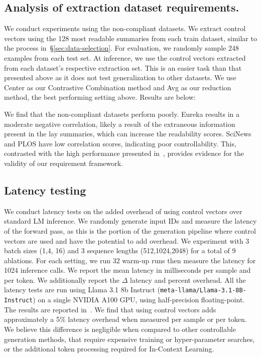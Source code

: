 \subsection{Analysis of extraction dataset requirements.}\label{sec:other-datasets-exp}
We conduct experiments using the non-compliant datasets. We extract control vectors using the 128 most readable summaries from each train dataset, similar to the process in~\S\ref{sec:data-selection}. For evaluation, we randomly sample 248 examples from each test set. At inference, we use the control vectors extracted from each dataset's respective extraction set. This is an easier task than that presented above as it does not test generalization to other datasets. We use Center as our Contrastive Combination method and Avg as our reduction method, the best performing setting above. Results are below:


We find that the non-compliant datasets perform poorly. Eureka results in a moderate negative correlation, likely a result of the extraneous information present in the lay summaries, which can increase the readability scores. SciNews and PLOS have low correlation scores, indicating poor controllability. This, contrasted with the high performance presented in~, provides evidence for the validity of our requirement framework.


\subsection{Latency testing}\label{appendix:latency-testing}

We conduct latency tests on the added overhead of using control vectors over standard LM inference. We randomly generate input IDs and measure the latency of the forward pass, as this is the portion of the generation pipeline where control vectors are used and have the potential to add overhead. We experiment with 3 batch sizes (1,4, 16) and 3 sequence lengths (512,1024,2048) for a total of 9 ablations. For each setting, we run 32 warm-up runs then measure the latency for 1024 inference calls. We report the mean latency in milliseconds per sample and per token. We additionally report the $\Delta$ latency and percent overhead. All the latency tests are run using Llama 3.1 8b Instruct (\texttt{meta-llama/Llama-3.1-8B-Instruct}) on a single NVIDIA A100 GPU, using half-precision floating-point. The results are reported in~. We find that using control vectors adds approximately a 5\% latency overhead when measured per sample or per token. We believe this difference is negligible when compared to other controllable generation methods, that require expensive training or hyper-parameter searches, or the additional token processing required for In-Context Learning. 